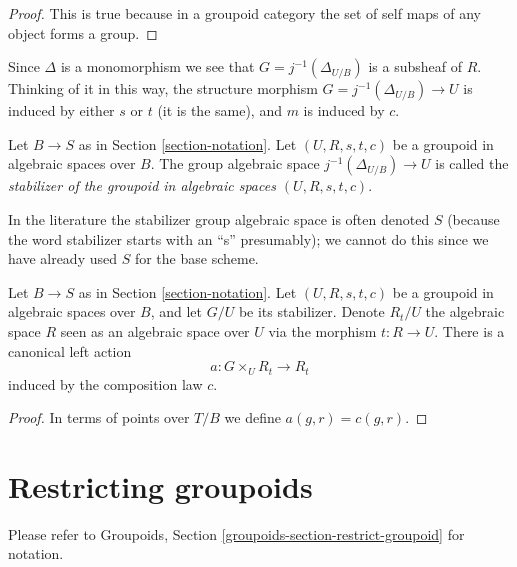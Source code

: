 \begin{proof}
This is true because in a groupoid category the
set of self maps of any object forms a group.
\end{proof}

\noindent
Since $\Delta$ is a monomorphism we see that $G = j^{-1}(\Delta_{U/B})$ is a
subsheaf of $R$. Thinking of it in this way, the structure morphism
$G = j^{-1}(\Delta_{U/B}) \to U$ is induced by either $s$ or $t$
(it is the same), and $m$ is induced by $c$.

\begin{definition}
\label{definition-stabilizer-groupoid}
Let $B \to S$ as in Section \ref{section-notation}.
Let $(U, R, s, t, c)$ be a groupoid in algebraic spaces over $B$.
The group algebraic space $j^{-1}(\Delta_{U/B}) \to U$ is called the
{\it stabilizer of the groupoid in algebraic spaces $(U, R, s, t, c)$}.
\end{definition}

\noindent
In the literature the stabilizer group algebraic space is often denoted $S$
(because the word stabilizer starts with an ``s'' presumably);
we cannot do this since we have already used $S$ for the base scheme.

\begin{lemma}
\label{lemma-groupoid-action-stabilizer}
Let $B \to S$ as in Section \ref{section-notation}.
Let $(U, R, s, t, c)$ be a groupoid in algebraic spaces over $B$, and let
$G/U$ be its stabilizer. Denote $R_t/U$ the algebraic space $R$ seen as an
algebraic space over $U$ via the morphism $t : R \to U$. There is a
canonical left action
$$
a : G \times_U R_t \longrightarrow R_t
$$
induced by the composition law $c$.
\end{lemma}

\begin{proof}
In terms of points over $T/B$ we define $a(g, r) = c(g, r)$.
\end{proof}








\section{Restricting groupoids}
\label{section-restrict-groupoid}

\noindent
Please refer to
Groupoids, Section \ref{groupoids-section-restrict-groupoid}
for notation.

